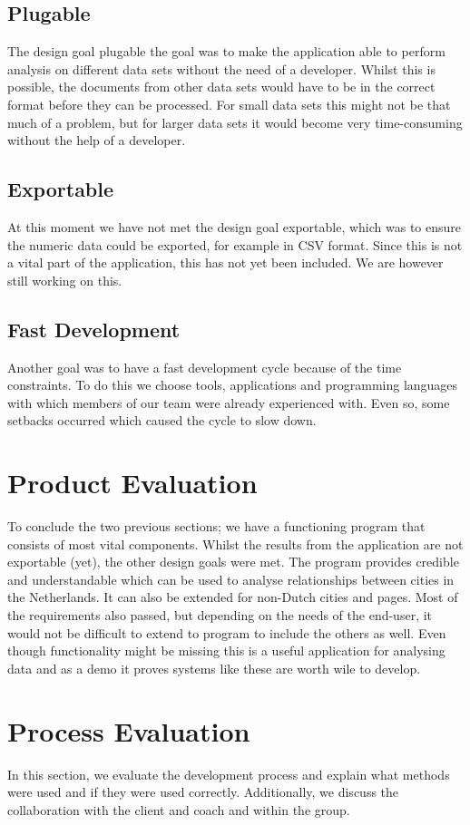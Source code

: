 \subsection{Plugable}
The design goal plugable the goal was to make the application able to perform analysis on different data sets without the need of a developer. Whilst this is possible, the documents from other data sets would have to be in the correct format before they can be processed. For small data sets this might not be that much of a problem, but for larger data sets it would become very time-consuming without the help of a developer.

\subsection{Exportable}
At this moment we have not met the design goal exportable, which was to ensure the numeric data could be exported, for example in CSV format. Since this is not a vital part of the application, this has not yet been included. We are however still working on this. 

\subsection{Fast Development}
Another goal was to have a fast development cycle because of the time constraints. To do this we choose tools, applications and programming languages with which members of our team were already experienced with. Even so, some setbacks occurred which caused the cycle to slow down.

\section{Product Evaluation}
To conclude the two previous sections; we have a functioning program that consists of most vital components. Whilst the results from the application are not exportable (yet), the other design goals were met. The program provides credible and understandable which can be used to analyse relationships between cities in the Netherlands. It can also be extended for non-Dutch cities and pages. Most of the requirements also passed, but depending on the needs of the end-user, it would not be difficult to extend to program to include the others as well. Even though functionality might be missing this is a useful application for analysing data and as a demo it proves systems like these are worth wile to develop.

\section{Process Evaluation}
In this section, we evaluate the development process and explain what methods were used and if they were used correctly. Additionally, we discuss the collaboration with the client and coach and within the group.


